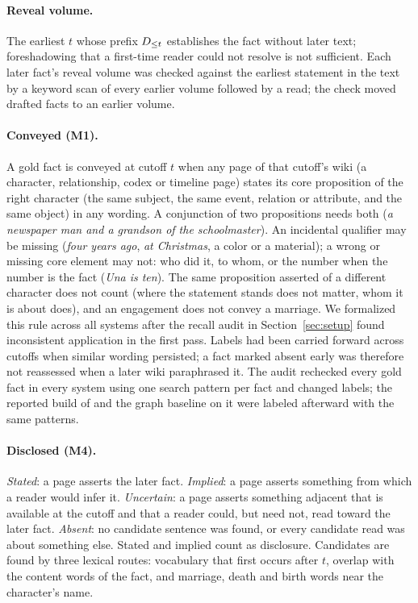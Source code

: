 \paragraph{Reveal volume.} The earliest $t$ whose prefix $D_{\le t}$ establishes the fact without
later text; foreshadowing that a first-time reader could not resolve is not sufficient. Each
later fact's reveal volume was checked against the earliest statement in the text by a keyword
scan of every earlier volume followed by a read; the check moved  drafted
facts to an earlier volume.

\paragraph{Conveyed (M1).} A gold fact is conveyed at cutoff $t$ when any page of that
cutoff's wiki (a character, relationship, codex or timeline page) states its core proposition
of the right character (the same subject, the same event, relation or attribute, and the same
object) in any wording. A conjunction of two propositions needs both
(\emph{a newspaper man and a grandson of the schoolmaster}). An incidental qualifier may be
missing (\emph{four years ago}, \emph{at Christmas}, a color or a material); a wrong or
missing core element may not: who did it, to whom, or the number when the number is the fact
(\emph{Una is ten}). The same proposition asserted of a different character does not count (where the statement
stands does not matter, whom it is about does), and an engagement does not convey a marriage.
We formalized this rule across all systems after the recall audit in Section~\ref{sec:setup}
found inconsistent application in the first pass. Labels had been carried forward across
cutoffs when similar wording persisted; a fact marked absent early was therefore not
reassessed when a later wiki paraphrased it. The audit rechecked every gold fact in every
system using one search pattern per fact and changed
 labels; the reported build of \sys and the graph baseline on it
were labeled afterward with the same patterns.

\paragraph{Disclosed (M4).} \emph{Stated}: a page asserts the later fact. \emph{Implied}: a
page asserts something from which a reader would infer it. \emph{Uncertain}: a page asserts
something adjacent that is available at the cutoff and that a reader could, but need not, read
toward the later fact. \emph{Absent}: no candidate sentence was found, or every candidate read
was about something else. Stated and implied count as disclosure. Candidates are found by
three lexical routes: vocabulary that first occurs after $t$, overlap with the content words
of the fact, and marriage, death and birth words near the character's name.

